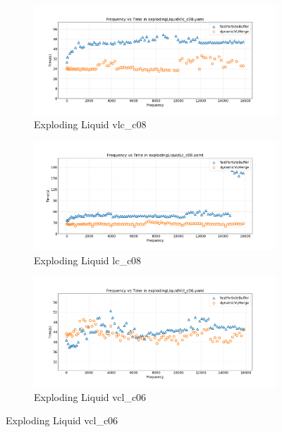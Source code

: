 \begin{figure}[htbp]
    \centering
    \vspace{-0.5em}
    \begin{subfigure}[b]{\textwidth}
        \centering
        \includegraphics[width=0.9\linewidth]{graphs/explodingLiquid/normalExperiments/freq/vlcc08.png}
        \vspace{-0.5em}
        \caption{\scriptsize Exploding Liquid vlc\_c08}
        \label{fig:vlcc08explodingLiquid}
    \end{subfigure}

    \begin{subfigure}[b]{\textwidth}
        \centering
        \includegraphics[width=0.9\linewidth]{graphs/explodingLiquid/normalExperiments/freq/lcc08.png}
        \vspace{-0.5em}
        \caption{\scriptsize Exploding Liquid lc\_c08}
        \label{fig:lcc08explodingLiquid}
    \end{subfigure}

    \begin{subfigure}[b]{\textwidth}
        \centering
        \includegraphics[width=0.9\linewidth]{graphs/explodingLiquid/normalExperiments/freq/vclc06.png}
        \vspace{-0.5em}
        \caption{\scriptsize Exploding Liquid vcl\_c06}
        \label{fig:vclc06explodingLiquid}
    \end{subfigure}


\end{figure}
